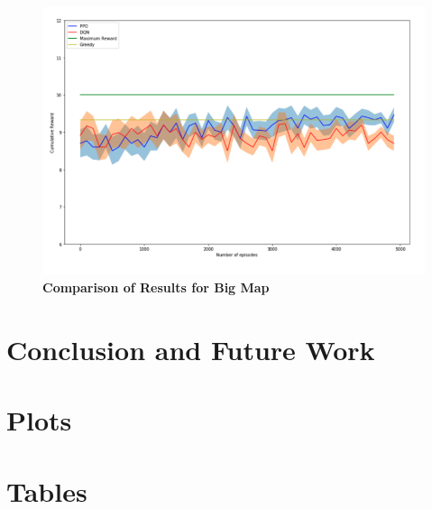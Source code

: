 \documentclass[12pt]{report}
\begin{document}
\begin{figure}[!h]
    \centering
    \includegraphics[width=12cm]{30.png}
    \caption{\textbf{Comparison of Results for Big Map}}
    \label{fig:x}
\end{figure}

\chapter{Conclusion and Future Work}
\appendix
\chapter{Plots}
\chapter{Tables}




      

\begin{thesisauthorvita}             
\end{thesisauthorvita}               
\end{document}
